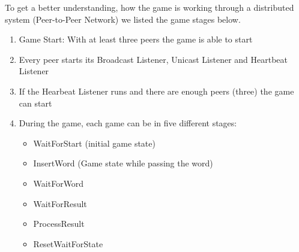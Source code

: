 \documentclass[runningheads]{llncs}
\begin{document}
    To get a better understanding, how the game is working through a distributed system (Peer-to-Peer Network) we listed the game stages below.
    \begin{enumerate}
        \item Game Start: With at least three peers the game is able to start
        \item Every peer starts its Broadcast Listener, Unicast Listener and Heartbeat Listener
        \item If the Hearbeat Listener runs and there are enough peers (three) the game can start
        \item During the game, each game can be in five different stages:
        \begin{itemize}
            \item WaitForStart (initial game state)
            \item InsertWord (Game state while passing the word)
            \item WaitForWord
            \item WaitForResult
            \item ProcessResult
            \item ResetWaitForState
        \end{itemize}
        

\end{enumerate}
\end{document}
